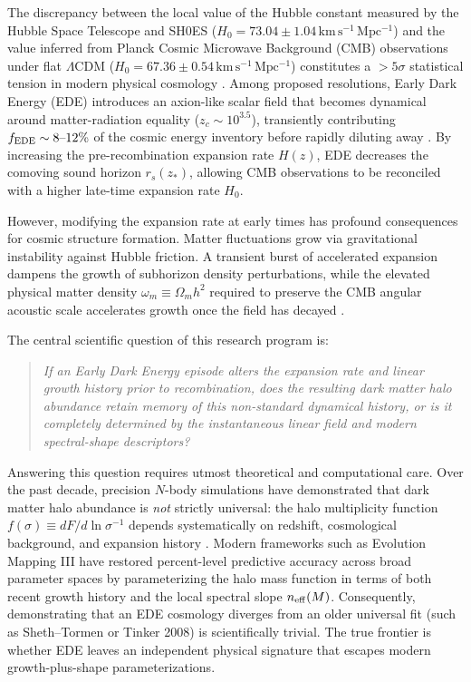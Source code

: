 \documentclass[11pt]{article}
\begin{document}
The discrepancy between the local value of the Hubble constant measured by the Hubble Space Telescope and SH0ES ($H_0 = 73.04 \pm 1.04\,\mathrm{km\,s^{-1}\,Mpc^{-1}}$) \cite{riess2022shoes} and the value inferred from Planck Cosmic Microwave Background (CMB) observations under flat $\Lambda\mathrm{CDM}$ ($H_0 = 67.36 \pm 0.54\,\mathrm{km\,s^{-1}\,Mpc^{-1}}$) \cite{planck2020params} constitutes a $>5\sigma$ statistical tension in modern physical cosmology \cite{KamionkowskiRiess2023,poulin2023review}. Among proposed resolutions, Early Dark Energy (EDE) introduces an axion-like scalar field that becomes dynamical around matter-radiation equality ($z_c \sim 10^{3.5}$), transiently contributing $f_{\rm EDE} \sim 8\text{--}12\%$ of the cosmic energy inventory before rapidly diluting away \cite{karwal2016ede,poulin2018ula,poulin2019ede}. By increasing the pre-recombination expansion rate $H(z)$, EDE decreases the comoving sound horizon $r_s(z_*)$, allowing CMB observations to be reconciled with a higher late-time expansion rate $H_0$.

However, modifying the expansion rate at early times has profound consequences for cosmic structure formation. Matter fluctuations grow via gravitational instability against Hubble friction. A transient burst of accelerated expansion dampens the growth of subhorizon density perturbations, while the elevated physical matter density $\omega_m \equiv \Omega_m h^2$ required to preserve the CMB angular acoustic scale accelerates growth once the field has decayed \cite{klypin2021ede}. 

The central scientific question of this research program is:
\begin{quote}
\emph{If an Early Dark Energy episode alters the expansion rate and linear growth history prior to recombination, does the resulting dark matter halo abundance retain memory of this non-standard dynamical history, or is it completely determined by the instantaneous linear field and modern spectral-shape descriptors?}
\end{quote}

Answering this question requires utmost theoretical and computational care. Over the past decade, precision $N$-body simulations have demonstrated that dark matter halo abundance is \emph{not} strictly universal: the halo multiplicity function $f(\sigma) \equiv dF/d\ln\sigma^{-1}$ depends systematically on redshift, cosmological background, and expansion history \cite{TinkerEtAl2008,WatsonEtAl2013,DespaliEtAl2016,OndaroMalleaEtAl2022}. Modern frameworks such as Evolution Mapping III \cite{FiorilliEtAl2026} have restored percent-level predictive accuracy across broad parameter spaces by parameterizing the halo mass function in terms of both recent growth history and the local spectral slope $n_{\rm eff}(M)$. Consequently, demonstrating that an EDE cosmology diverges from an older universal fit (such as Sheth--Tormen or Tinker 2008) is scientifically trivial. The true frontier is whether EDE leaves an independent physical signature that escapes modern growth-plus-shape parameterizations.
\end{document}

